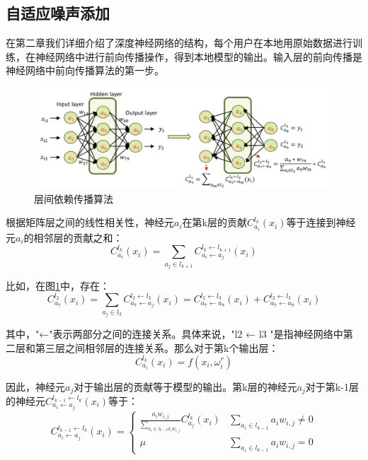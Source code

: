 \subsection{自适应噪声添加}
在第二章我们详细介绍了深度神经网络的结构，每个用户在本地用原始数据进行训练，在神经网络中进行前向传播操作，得到本地模型的输出。输入层的前向传播是神经网络中前向传播算法的第一步。

\begin{figure}[!hbt]
\centering
	\includegraphics[scale=0.5]{fig2/C3/前向传播算法}%
	\caption{层间依赖传播算法}
	\label{fig:层间依赖传播算法}	
\end{figure}

根据矩阵层之间的线性相关性，神经元$a_{i}$在第k层的贡献$C_{a_{i}}^{l_{k}}\left(x_{i}\right)$等于连接到神经元$a_{i}$的相邻层的贡献之和：
\begin{equation}\label{eq:层间传播1}
C_{a_{i}}^{l_{k}}\left(x_{i}\right)=\sum_{a_{j} \in l_{k+1}} C_{a_{i} \leftarrow a_{j}}^{l_{k} \leftarrow l_{k+1}}\left(x_{i}\right)
\end{equation}

比如，在图\ref{fig:层间依赖传播算法}中，存在：
\begin{equation}\label{eq:层间传播2}
C_{a_{7}}^{l_{2}}\left(x_{i}\right)=\sum_{a_{j} \in l_{3}} C_{a_{7} \leftarrow a_{j}}^{l_{2} \leftarrow l_{3}}\left(x_{i}\right)=C_{a_{7} \leftarrow a_{8}}^{l_{2} \leftarrow l_{3}}\left(x_{i}\right)+C_{a_{7} \leftarrow a_{9}}^{l_{2} \leftarrow l_{3}}\left(x_{i}\right)
\end{equation}

其中，"←"表示两部分之间的连接关系。具体来说，"l2 ← l3 "是指神经网络中第二层和第三层之间相邻层的连接关系。那么对于第k个输出层：
\begin{equation}
C_{a_{i}}^{l_{k}}\left(x_{i}\right)=f\left(x_{i},\omega_{i}^{r}\right)
\end{equation}

因此，神经元$a_{j}$对于输出层的贡献等于模型的输出。第k层的神经元$a_{j}$对于第k-1层的神经元$C_{a_{i} \leftarrow a_{j}}^{l_{k-1} \leftarrow l_{k}}\left(x_{i}\right)$等于：
\begin{equation}
C_{a_{i} \leftarrow a_{j}}^{l_{k-1} \leftarrow l_{k}}\left(x_{i}\right)=\left\{\begin{array}{cc}\frac{a_{i} w_{i, j}}{\sum_{a_{i} \in l_{k-1} a_{i} w_{i, j}}} C_{a_{j}}^{l_{k}}\left(x_{i}\right) & \sum_{a_{i} \in l_{k-1}} a_{i} w_{i, j} \neq 0 \\ \mu & \sum_{a_{i} \in l_{k-1}} a_{i} w_{i, j}=0\end{array}\right.
\end{equation}

